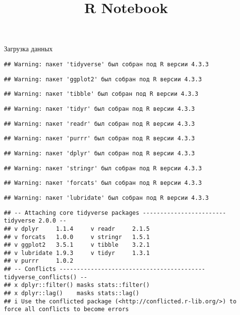 \documentclass[
]{article}
\title{R Notebook}
\author{}
\date{\vspace{-2.5em}}
\begin{document}
\maketitle

Загрузка данных

\begin{verbatim}
## Warning: пакет 'tidyverse' был собран под R версии 4.3.3
\end{verbatim}

\begin{verbatim}
## Warning: пакет 'ggplot2' был собран под R версии 4.3.3
\end{verbatim}

\begin{verbatim}
## Warning: пакет 'tibble' был собран под R версии 4.3.3
\end{verbatim}

\begin{verbatim}
## Warning: пакет 'tidyr' был собран под R версии 4.3.3
\end{verbatim}

\begin{verbatim}
## Warning: пакет 'readr' был собран под R версии 4.3.3
\end{verbatim}

\begin{verbatim}
## Warning: пакет 'purrr' был собран под R версии 4.3.3
\end{verbatim}

\begin{verbatim}
## Warning: пакет 'dplyr' был собран под R версии 4.3.3
\end{verbatim}

\begin{verbatim}
## Warning: пакет 'stringr' был собран под R версии 4.3.3
\end{verbatim}

\begin{verbatim}
## Warning: пакет 'forcats' был собран под R версии 4.3.3
\end{verbatim}

\begin{verbatim}
## Warning: пакет 'lubridate' был собран под R версии 4.3.3
\end{verbatim}

\begin{verbatim}
## -- Attaching core tidyverse packages ------------------------ tidyverse 2.0.0 --
## v dplyr     1.1.4     v readr     2.1.5
## v forcats   1.0.0     v stringr   1.5.1
## v ggplot2   3.5.1     v tibble    3.2.1
## v lubridate 1.9.3     v tidyr     1.3.1
## v purrr     1.0.2     
## -- Conflicts ------------------------------------------ tidyverse_conflicts() --
## x dplyr::filter() masks stats::filter()
## x dplyr::lag()    masks stats::lag()
## i Use the conflicted package (<http://conflicted.r-lib.org/>) to force all conflicts to become errors
\end{verbatim}
\end{document}
